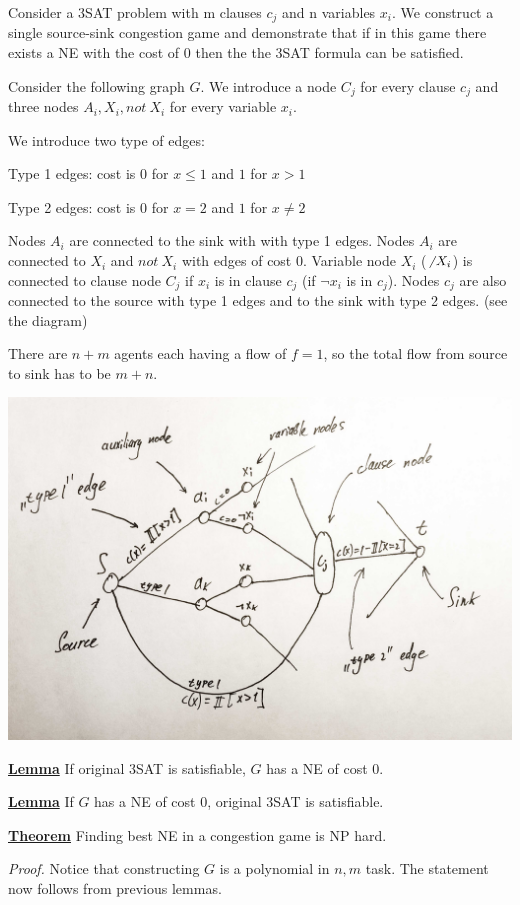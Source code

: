 Consider a 3SAT problem with m clauses $c_j$ and n variables $x_i$. We construct a single source-sink congestion game and demonstrate that if in this game there exists a NE with the cost of 0 then the the 3SAT formula can be satisfied.

Consider the following graph $G$. We introduce a node $C_j$ for every clause $c_j$ and three nodes $A_i,X_i,not\ X_i$ for every variable $x_i$.

We introduce two type of edges:

Type 1 edges: cost is 0 for $x\leq1$ and $1$ for $x>1$

Type 2 edges: cost is 0 for $x=2$ and $1$ for $x\neq 2$

Nodes $A_i$ are connected to the sink with with type 1 edges. Nodes $A_i$ are connected to $X_i$ and $not\ X_i$ with edges of cost 0. Variable node $X_i$ ($\not\ X_i$) is connected to clause node $C_j$ if $x_i$ is in clause $c_j$ (if $\neg x_i$ is in $c_j$). Nodes $c_j$ are also connected to the source with type 1 edges and to the sink with type 2 edges. (see the diagram)

There are $n+m$ agents each having a flow of $f=1$, so the total flow from source to sink has to be $m+n$.
\bigskip

\includegraphics[scale=0.2]{1.jpg}

\uline{\textbf{Lemma}} If original 3SAT is satisfiable, $G$ has a NE of cost 0.

\uline{\textbf{Lemma}} If  $G$ has a NE of cost 0, original 3SAT is satisfiable.

\uline{\textbf{Theorem}} Finding best NE in a congestion game is NP hard.


\textit{Proof.} Notice that constructing $G$ is a polynomial in $n,m$ task. The statement now follows from previous lemmas.

